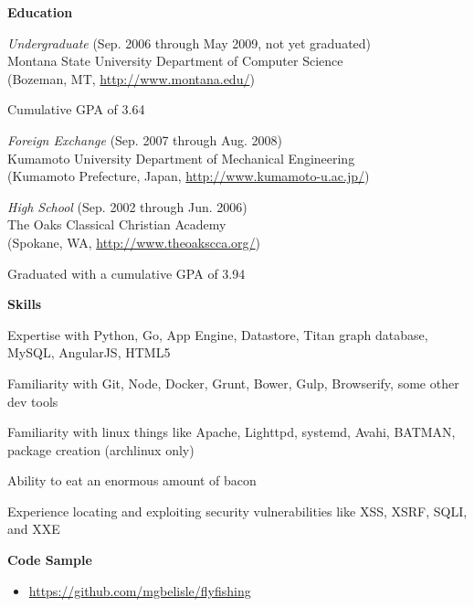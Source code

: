 \documentclass[10pt, a4paper]{article}
\begin{document}
\textbf{Education}
\begin{itemize*}
  \item \emph{Undergraduate} (Sep. 2006 through May 2009, not yet graduated)\\
    Montana State University Department of Computer Science\\
    (Bozeman, MT, \url{http://www.montana.edu/})
    \begin{itemize*}
      \item Cumulative GPA of 3.64
    \end{itemize*}
  \item \emph{Foreign Exchange} (Sep. 2007 through Aug. 2008) \\ Kumamoto University Department of Mechanical Engineering \\(Kumamoto Prefecture, Japan, \url{http://www.kumamoto-u.ac.jp/})
  \item \emph{High School} (Sep. 2002 through Jun. 2006)\\
    The Oaks Classical Christian Academy\\
    (Spokane, WA, \url{http://www.theoakscca.org/})
    \begin{itemize*}
      \item Graduated with a cumulative GPA of 3.94
    \end{itemize*}
\end{itemize*}
\textbf{Skills}
\begin{itemize*}
  \item Expertise with Python, Go, App Engine, Datastore, Titan graph database, MySQL, AngularJS, HTML5
  \item Familiarity with Git, Node, Docker, Grunt, Bower, Gulp, Browserify, some other dev tools
  \item Familiarity with linux things like Apache, Lighttpd, systemd, Avahi, BATMAN, package creation (archlinux only)
  \item Ability to eat an enormous amount of bacon
  \item Experience locating and exploiting security vulnerabilities like XSS, XSRF, SQLI, and XXE
\end{itemize*}
\textbf{Code Sample}
\begin{itemize}
  \item[] \url{https://github.com/mgbelisle/flyfishing}
\end{itemize}
\end{document}
